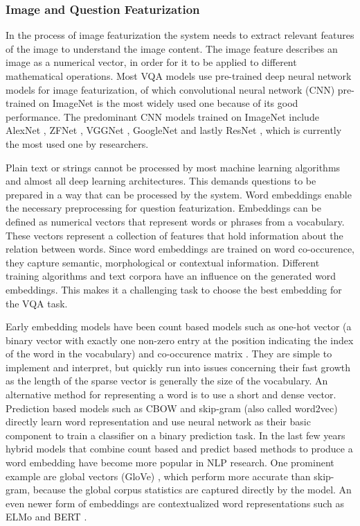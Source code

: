 \documentclass{article}
\begin{document}
\subsubsection{Image and Question Featurization}

In the process of image featurization the system needs to extract relevant features of the image to understand the image content. The image feature describes an image as a numerical vector, in order for it to be applied to different mathematical operations. Most VQA models use pre-trained deep neural network models for image featurization, of which convolutional neural network (CNN) \citep{krizhevsky2012imagenet} pre-trained on ImageNet \citep{russakovsky2015imagenet} is the most widely used one because of its good performance. The predominant CNN models trained on ImageNet include AlexNet \citep{krizhevsky2012imagenet}, ZFNet \citep{zeiler2014visual}, VGGNet \citep{simonyan2015very}, GoogleNet \citep{szegedy2015going} and lastly ResNet \citep{residual}, which is currently the most used one by researchers.

Plain text or strings cannot be processed by most machine learning algorithms and almost all deep learning architectures. This demands questions to be prepared in a way that can be processed by the system. Word embeddings enable the necessary preprocessing for question featurization. Embeddings can be defined as numerical vectors that represent words or phrases from a vocabulary. These vectors represent a collection of features that hold information about the relation between words. Since word embeddings are trained on word co-occurence, they capture semantic, morphological or contextual information. Different training algorithms and text corpora have an influence on the generated word embeddings. This makes it a challenging task to choose the best embedding for the VQA task.

Early embedding models have been count based models such as one-hot vector (a binary vector with exactly one non-zero entry at the position indicating the index of the word in the vocabulary) and co-occurence matrix \citep{miller1991contextual}. They are simple to implement and interpret, but quickly run into issues concerning their fast growth as the length of the sparse vector is generally the size of the vocabulary. An alternative method for representing a word is to use a short and dense vector. Prediction based models such as CBOW and skip-gram (also called word2vec) \citep{mikolov2013efficient} directly learn word representation and use neural network as their basic component to train a classifier on a binary prediction task. In the last few years hybrid models that combine count based and predict based methods to produce a word embedding have become more popular in NLP research. One prominent example are global vectors (GloVe) \citep{pennington2014glove}, which perform more accurate than skip-gram, because the global corpus statistics are captured directly by the model. An even newer form of embeddings are contextualized word representations such as ELMo \citep{peters2018elmo} and BERT \citep{devlin-etal-2019-bert}.
\end{document}
